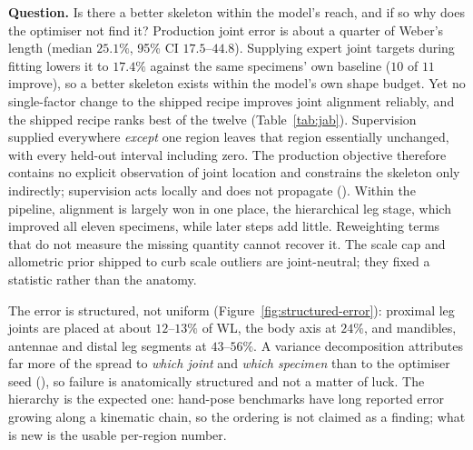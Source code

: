 \textbf{Question.} Is there a better skeleton within the model's reach, and if
so why does the optimiser not find it? Production joint error is about a
quarter of Weber's length (median $25.1\%$, 95\% CI $17.5$--$44.8$). Supplying
expert joint targets during fitting lowers it to $17.4\%$ against the same
specimens' own baseline ($10$ of $11$ improve), so a better skeleton exists
within the model's own shape budget. Yet no single-factor change to the shipped
recipe improves joint alignment reliably, and the shipped recipe ranks best of
the twelve (Table~\ref{tab:jab}). Supervision supplied everywhere \emph{except}
one region leaves that region essentially unchanged, with every held-out
interval including zero. The production objective therefore contains no
explicit observation of joint location and constrains the skeleton only
indirectly; supervision acts locally and does not propagate (). Within
the pipeline, alignment is largely won in one place, the hierarchical leg
stage, which improved all eleven specimens, while later steps add little.
Reweighting terms that do not measure the missing quantity cannot recover it.
The scale cap and allometric prior shipped to curb scale outliers are
joint-neutral; they fixed a statistic rather than the anatomy.

The error is structured, not uniform (Figure~\ref{fig:structured-error}):
proximal leg joints are placed at about $12$--$13\%$ of WL, the body axis at
$24\%$, and mandibles, antennae and distal leg segments at $43$--$56\%$. A
variance decomposition attributes far more of the spread to \emph{which joint}
and \emph{which specimen} than to the optimiser seed (), so failure is
anatomically structured and not a matter of luck. The hierarchy is the expected
one: hand-pose benchmarks have long reported error growing along a kinematic
chain, so the ordering is not claimed as a finding; what is new is the usable
per-region number.

